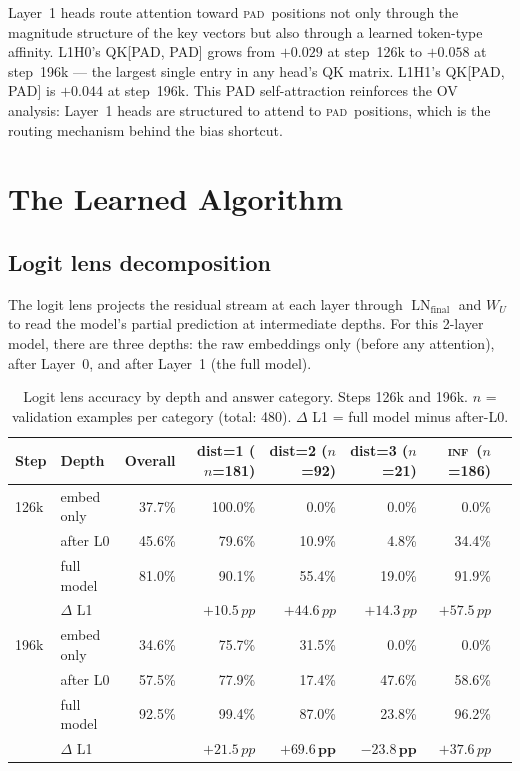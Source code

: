 \documentclass[11pt, a4paper]{article}
\DeclareMathOperator{\LN}{LN}
\newcommand{\INF}{\textsc{inf}}
\newcommand{\PAD}{\textsc{pad}}
\newcommand{\pp}{\,pp}  %
\begin{document}
Layer~1 heads route attention toward \PAD\ positions not only through
the magnitude structure of the key vectors but also through a learned
token-type affinity.  L1H0's QK[PAD, PAD] grows from $+0.029$ at
step~126k to $+0.058$ at step~196k --- the largest single entry in any
head's QK matrix.  L1H1's QK[PAD, PAD] is $+0.044$ at step~196k.
This PAD self-attraction reinforces the OV analysis: Layer~1 heads are
structured to attend to \PAD\ positions, which is the routing
mechanism behind the bias shortcut.

\section{The Learned Algorithm}
\label{sec:algorithm}

\subsection{Logit lens decomposition}

The logit lens \citep{nostalgebraist2020} projects the residual stream
at each layer through $\LN_{\mathrm{final}}$ and $W_U$ to read the
model's partial prediction at intermediate depths.  For this 2-layer
model, there are three depths: the raw embeddings only (before any
attention), after Layer~0, and after Layer~1 (the full model).

\begin{table}[H]
\centering
\caption{Logit lens accuracy by depth and answer category.  Steps 126k
  and 196k.  $n$ = validation examples per category (total: 480).
  $\Delta$ L1 = full model minus after-L0.}
\label{tab:logit-lens}
\begin{tabular}{@{}llrrrrrr@{}}
\toprule
Step & Depth & Overall &
  dist=1 ($n$=181) & dist=2 ($n$=92) &
  dist=3 ($n$=21) & \INF\ ($n$=186) \\
\midrule
126k & embed only  & 37.7\% & 100.0\% & 0.0\%  & 0.0\%  & 0.0\%  \\
     & after L0    & 45.6\% & 79.6\%  & 10.9\% & 4.8\%  & 34.4\% \\
     & full model  & 81.0\% & 90.1\%  & 55.4\% & 19.0\% & 91.9\% \\
     & $\Delta$ L1 &        & $+10.5\pp$ & $+44.6\pp$ & $+14.3\pp$ & $+57.5\pp$ \\
\midrule
196k & embed only  & 34.6\% & 75.7\%  & 31.5\% & 0.0\%  & 0.0\%  \\
     & after L0    & 57.5\% & 77.9\%  & 17.4\% & 47.6\% & 58.6\% \\
     & full model  & 92.5\% & 99.4\%  & 87.0\% & 23.8\% & 96.2\% \\
     & $\Delta$ L1 &        & $+21.5\pp$ & $\mathbf{+69.6\pp}$ &
       $\mathbf{-23.8\pp}$ & $+37.6\pp$ \\
\bottomrule
\end{tabular}
\end{table}
\end{document}
